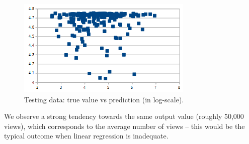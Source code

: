	\begin{figure}[!h]
		\begin{center}
			\includegraphics[width=.75\textwidth,clip]{logistic regression testing.png}
		\end{center}
		\caption{Testing data: true value vs prediction (in log-scale).}
		\label{fig:testingTrueVsPredicted}
	\end{figure}
	
	We observe a strong tendency towards the same output value (roughly 50,000 views), which corresponds to the average number of views -- this would be the typical outcome when linear regression is inadequate.
